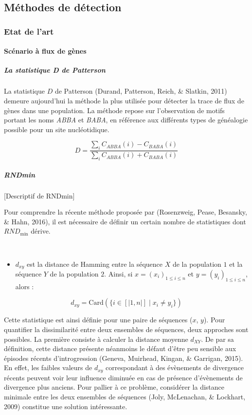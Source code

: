 \documentclass[12pt,twoside]{ugathesis}
\providecommand{\tightlist}{%
  \setlength{\itemsep}{0pt}\setlength{\parskip}{0pt}}
\begin{document}
  \newpage
  
  \subsection{Méthodes de détection}\label{methodes-de-detection}
  
  \subsubsection{Etat de l'art}\label{etat-de-lart-1}
  
  \paragraph{Scénario à flux de gènes}\label{scenario-a-flux-de-genes}
  
  \subparagraph{La statistique D de
  Patterson}\label{la-statistique-d-de-patterson}
  
  La statistique \(D\) de Patterson (Durand, Patterson, Reich, \& Slatkin,
  2011) demeure aujourd'hui la méthode la plus utilisée pour détecter la
  trace de flux de gènes dans une population. La méthode repose sur
  l'observation de motifs portant les noms \emph{ABBA} et \emph{BABA}, en
  référence aux différents types de généalogie possible pour un site
  nucléotidique.
  
  \[ D = \displaystyle \frac{\sum_i C_{ABBA}(i) - C_{BABA}(i)}{\sum_i C_{ABBA}(i) + C_{BABA}(i)} \]
  
  \subparagraph{RNDmin}\label{rndmin}
  
  {[}Descriptif de RNDmin{]}
  
  Pour comprendre la récente méthode proposée par (Rosenzweig, Pease,
  Besansky, \& Hahn, 2016), il est nécessaire de définir un certain nombre
  de statistiques dont \(RND_{\text{min}}\) dérive.
  
  ~
  \begin{itemize}
  \tightlist
  \item
    \(d_{xy}\) est la distance de Hamming entre la séquence \(X\) de la
    population \(1\) et la séquence \(Y\) de la population \(2\). Ainsi,
    si \(x = (x_i)_{1 \leq i \leq n}\) et \(y = (y_i)_{1 \leq i \leq n}\),
    alors :
  \end{itemize}
  \[d_{xy} = \text{Card}(\{i \in [|1, n|] \; | \; x_i \neq y_i \})\]
  
  Cette statistique est ainsi définie pour une paire de séquences (\(x\),
  \(y\)). Pour quantifier la dissimilarité entre deux ensembles de
  séquences, deux approches sont possibles. La première consiste à
  calculer la distance moyenne \(d_{XY}\). De par sa définition, cette
  distance présente néanmoins le défaut d'être peu sensible aux épisodes
  récents d'introgression (Geneva, Muirhead, Kingan, \& Garrigan, 2015).
  En effet, les faibles valeurs de \(d_{xy}\) correspondant à des
  évènements de divergence récents peuvent voir leur influence diminuée en
  cas de présence d'évènements de divergence plus anciens. Pour pallier à
  ce problème, considérer la distance minimale entre les deux ensembles de
  séquences (Joly, McLenachan, \& Lockhart, 2009) constitue une solution
  intéressante.
  
\end{document}
